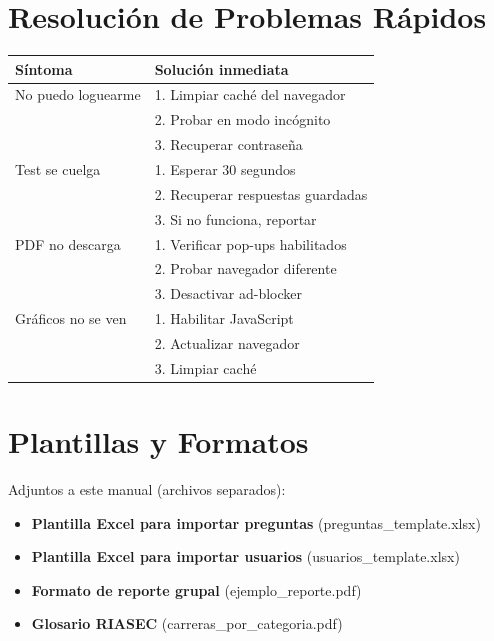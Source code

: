 \documentclass[12pt, a4paper]{report}
\begin{document}
\section{Resolución de Problemas Rápidos}
\begin{table}[htbp]
\centering
\begin{tabularx}{\textwidth}{|l|X|}
\hline
\textbf{Síntoma} & \textbf{Solución inmediata} \\
\hline
No puedo loguearme & 1. Limpiar caché del navegador \\
& 2. Probar en modo incógnito \\
& 3. Recuperar contraseña \\
\hline
Test se cuelga & 1. Esperar 30 segundos \\
& 2. Recuperar respuestas guardadas \\
& 3. Si no funciona, reportar \\
\hline
PDF no descarga & 1. Verificar pop-ups habilitados \\
& 2. Probar navegador diferente \\
& 3. Desactivar ad-blocker \\
\hline
Gráficos no se ven & 1. Habilitar JavaScript \\
& 2. Actualizar navegador \\
& 3. Limpiar caché \\
\hline
\end{tabularx}
\end{table}

\section{Plantillas y Formatos}
Adjuntos a este manual (archivos separados):
\begin{itemize}
    \item \textbf{Plantilla Excel para importar preguntas} (preguntas\_template.xlsx)
    \item \textbf{Plantilla Excel para importar usuarios} (usuarios\_template.xlsx)
    \item \textbf{Formato de reporte grupal} (ejemplo\_reporte.pdf)
    \item \textbf{Glosario RIASEC} (carreras\_por_categoria.pdf)
\end{itemize}
\end{document}
